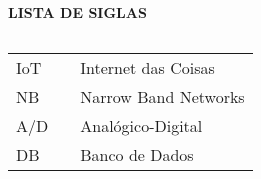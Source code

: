 \newpage

\begin{center}
\textbf{LISTA DE SIGLAS}
\end{center}
$\!$\\

\begin{tabular}{lll}
IoT & \hspace{1cm} & Internet das Coisas \\
NB &\hspace{1cm} &  Narrow Band Networks \\
A/D & \hspace{1cm} & Analógico-Digital \\
DB&  \hspace{1cm} & Banco de Dados \\
\end{tabular}
